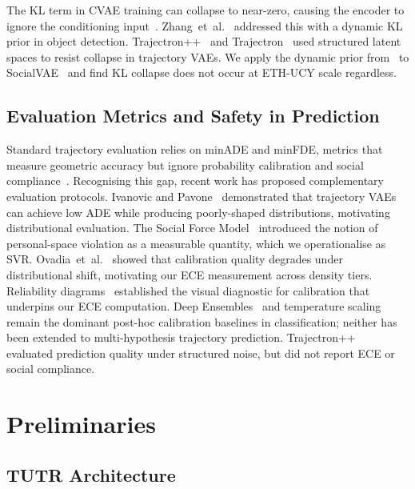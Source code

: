 \documentclass[journal,letterpaper]{IEEEtran}
\makeatletter
\newcommand{\etal}{et~al.\@}
\makeatother
\begin{document}
The KL term in CVAE training can collapse to near-zero, causing the
encoder to ignore the conditioning
input~\cite{lucas2019elbo}.
Zhang~\etal~\cite{zhang2025openworld} addressed this with a dynamic KL
prior in object detection.
Trajectron++~\cite{salzmann2020trajectron} and
Trajectron~\cite{ivanovic2019trajectron} used structured latent spaces
to resist collapse in trajectory VAEs.
We apply the dynamic prior from~\cite{zhang2025openworld} to
SocialVAE~\cite{xu2022socialvae} and find KL collapse does not occur
at ETH-UCY scale regardless.


\subsection{Evaluation Metrics and Safety in Prediction}

Standard trajectory evaluation relies on minADE and minFDE, metrics
that measure geometric accuracy but ignore probability calibration
and social compliance~\cite{alahi2016social,gupta2018social}.
Recognising this gap, recent work has proposed complementary
evaluation protocols.
Ivanovic and Pavone~\cite{ivanovic2019trajectron} demonstrated that
trajectory VAEs can achieve low ADE while producing poorly-shaped
distributions, motivating distributional evaluation.
The Social Force Model~\cite{helbing1995social} introduced the notion
of personal-space violation as a measurable quantity, which we
operationalise as SVR.
Ovadia~\etal~\cite{ovadia2019can} showed that calibration quality
degrades under distributional shift, motivating our ECE measurement
across density tiers.
Reliability diagrams~\cite{niculescu2005predicting} established the
visual diagnostic for calibration that underpins our ECE computation.
Deep Ensembles~\cite{lakshminarayanan2017simple} and temperature
scaling~\cite{guo2017calibration} remain the dominant post-hoc
calibration baselines in classification; neither has been extended
to multi-hypothesis trajectory prediction.
Trajectron++~\cite{salzmann2020trajectron} evaluated prediction
quality under structured noise, but did not report ECE or social
compliance.

\section{Preliminaries}
\label{sec:prelim}

\subsection{TUTR Architecture}
\end{document}
